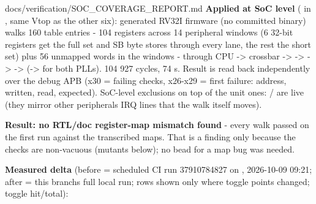 \begin{relocated}{docs/verification/SOC_COVERAGE_REPORT.md}
\textbf{Applied at SoC level} ( in
, same Vtop as the other six): generated
RV32I firmware (no committed binary) walks 160 table entries - 104
registers across 14 peripheral windows (6 32-bit registers get the full
set and SB byte stores through every lane, the rest the short set) plus
56 unmapped words in the windows - through CPU -\textgreater{} crossbar
-\textgreater{}  -\textgreater{}
 -\textgreater{} 
-\textgreater{}  (-\textgreater{}
 for both PLLs). 104 927 cycles, 74 s. Result is
read back independently over the debug APB (x30 = failing checks,
x26-x29 = first failure: address, written, read, expected). SoC-level
exclusions on top of the unit ones:
/ are live (they mirror other
peripherals\textquotesingle{} IRQ lines that the walk itself moves).

\textbf{Result: no RTL/doc register-map mismatch found} - every walk
passed on the first run against the transcribed maps. That is a finding
only because the checks are non-vacuous (mutants below); no bead for a
map bug was needed.

\textbf{Measured delta} (before = scheduled CI run 37910784827 on
, 2026-10-09 09:21; after = this branch\textquotesingle s
full local run; rows shown only where toggle points changed; toggle
hit/\allowbreak{}total):

{\small\setlength{\tabcolsep}{4pt}

}
\end{relocated}
